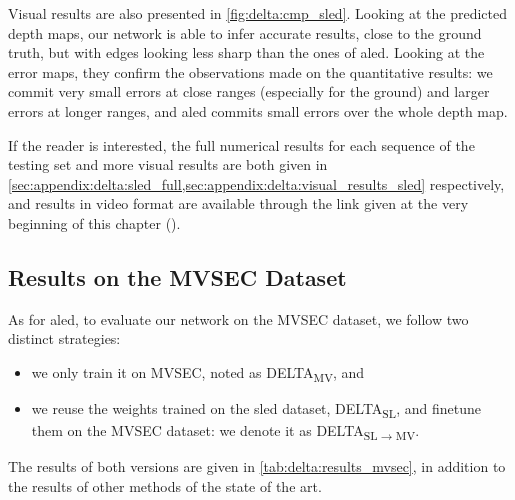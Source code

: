 Visual results are also presented in \cref{fig:delta:cmp_sled}. Looking at the predicted depth maps, our network is able to infer accurate results, close to the ground truth, but with edges looking less sharp than the ones of \acrshort{aled}. Looking at the error maps, they confirm the observations made on the quantitative results: we commit very small errors at close ranges (especially for the ground) and larger errors at longer ranges, and \acrshort{aled} commits small errors over the whole depth map.

If the reader is interested, the full numerical results for each sequence of the testing set and more visual results are both given in \cref{sec:appendix:delta:sled_full,sec:appendix:delta:visual_results_sled} respectively, and results in video format are available through the link given at the very beginning of this chapter ().

\subsection{Results on the MVSEC Dataset}
As for \acrshort{aled}, to evaluate our network on the MVSEC dataset, we follow two distinct strategies:
\begin{itemize}
  \item we only train it on MVSEC, noted as DELTA\textsubscript{MV}, and 
  \item we reuse the weights trained on the \acrshort{sled} dataset, DELTA\textsubscript{SL}, and finetune them on the MVSEC dataset: we denote it as DELTA\textsubscript{SL\(\rightarrow\)MV}.
\end{itemize}
The results of both versions are given in \cref{tab:delta:results_mvsec}, in addition to the results of other methods of the state of the art.

